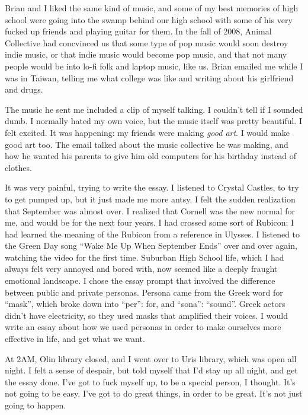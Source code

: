 Brian and I liked the same kind of music, and some of my best memories of high
school were going into the swamp behind our high school with some of his very
fucked up friends and playing guitar for them.  In the fall of 2008, Animal
Collective had concvinced us that some type of pop music would soon destroy
indie music, or that indie music would become pop music, and that not many
people would be into lo-fi folk and laptop music, like us.  Brian emailed me
while I was in Taiwan, telling me what college was like and writing about his
girlfriend and drugs.

The music he sent me included a clip of myself talking.  I couldn't tell if I
sounded dumb.  I normally hated my own voice, but the music itself was pretty
beautiful.  I felt excited.  It was happening: my friends were making
\textit{good art}.  I would make good art too.  The email talked about the music
collective he was making, and how he wanted his parents to give him old
computers for his birthday instead of clothes.

It was very painful, trying to write the essay.  I listened to Crystal Castles,
to try to get pumped up, but it just made me more antsy.  I felt the sudden
realization that September was almost over.  I realized that Cornell was the new
normal for me, and would be for the next four years.  I had crossed some sort of
Rubicon: I had learned the meaning of the Rubicon from a reference in Ulysses.
I listened to the Green Day song ``Wake Me Up When September Ends'' over and
over again, watching the video for the first time.  Suburban High School life,
which I had always felt very annoyed and bored with, now seemed like a deeply
fraught emotional landscape.  I chose the essay prompt that involved the
difference between public and private personas.  Persona came from the Greek
word for ``mask'', which broke down into ``per'': for, and ``sona'': ``sound''.
Greek actors didn't have electricity, so they used masks that amplified their
voices.  I would write an essay about how we used personas in order to make
ourselves more effective in life, and get what we want.

At 2AM, Olin library closed, and I went over to Uris library, which was open all
night.  I felt a sense of despair, but told myself that I'd stay up all night,
and get the essay done.  I've got to fuck myself up, to be a special person, I
thought.  It's not going to be easy.  I've got to do great things, in order to
be great.  It's not just going to happen.

